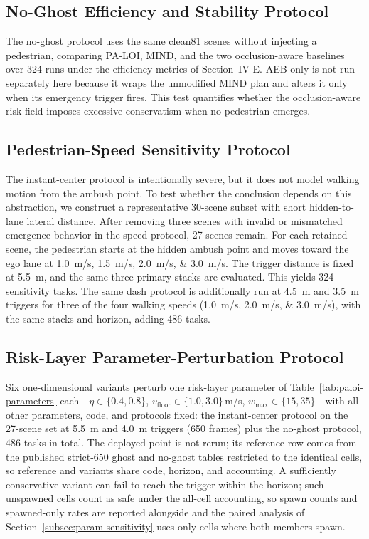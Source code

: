 \documentclass[journal]{IEEEtran}
\begin{document}
\subsection{No-Ghost Efficiency and Stability Protocol}

The no-ghost protocol uses the same clean81 scenes without injecting a pedestrian, comparing PA-LOI, MIND, and the two occlusion-aware baselines over 324 runs under the efficiency metrics of Section~IV-E. AEB-only is not run separately here because it wraps the unmodified MIND plan and alters it only when its emergency trigger fires. This test quantifies whether the occlusion-aware risk field imposes excessive conservatism when no pedestrian emerges.

\subsection{Pedestrian-Speed Sensitivity Protocol}

The instant-center protocol is intentionally severe, but it does not model walking motion from the ambush point. To test whether the conclusion depends on this abstraction, we construct a representative 30-scene subset with short hidden-to-lane lateral distance. After removing three scenes with invalid or mismatched emergence behavior in the speed protocol, 27 scenes remain. For each retained scene, the pedestrian starts at the hidden ambush point and moves toward the ego lane at \SIlist{1.0;1.5;2.0;3.0}{m/s}. The trigger distance is fixed at \SI{5.5}{m}, and the same three primary stacks are evaluated. This yields 324 sensitivity tasks. The same dash protocol is additionally run at \SI{4.5}{m} and \SI{3.5}{m} triggers for three of the four walking speeds (\SIlist{1.0;2.0;3.0}{m/s}), with the same stacks and horizon, adding 486 tasks.

\subsection{Risk-Layer Parameter-Perturbation Protocol}

Six one-dimensional variants perturb one risk-layer parameter of Table~\ref{tab:paloi-parameters} each---$\eta\in\{0.4,0.8\}$, $v_{\mathrm{floor}}\in\{1.0,3.0\}$\,m/s, $w_{\max}\in\{15,35\}$---with all other parameters, code, and protocols fixed: the instant-center protocol on the 27-scene set at \SI{5.5}{m} and \SI{4.0}{m} triggers (650 frames) plus the no-ghost protocol, 486 tasks in total. The deployed point is not rerun; its reference row comes from the published strict-650 ghost and no-ghost tables restricted to the identical cells, so reference and variants share code, horizon, and accounting. A sufficiently conservative variant can fail to reach the trigger within the horizon; such unspawned cells count as safe under the all-cell accounting, so spawn counts and spawned-only rates are reported alongside and the paired analysis of Section~\ref{subsec:param-sensitivity} uses only cells where both members spawn.
\end{document}
